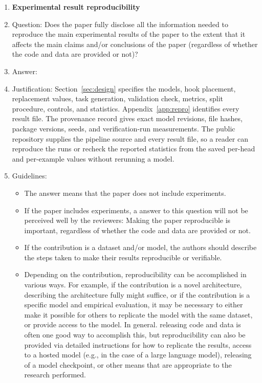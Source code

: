 \begin{enumerate}
    \item {\bf Experimental result reproducibility}
    \item[] Question: Does the paper fully disclose all the information needed to reproduce the main experimental results of the paper to the extent that it affects the main claims and/or conclusions of the paper (regardless of whether the code and data are provided or not)?
    \item[] Answer: \answerYes{}
    \item[] Justification: Section~\ref{sec:design} specifies the models, hook placement, replacement values, task generation, validation check, metrics, split procedure, controls, and statistics. Appendix~\ref{app:repro} identifies every result file. The provenance record gives exact model revisions, file hashes, package versions, seeds, and verification-run measurements. The public repository supplies the pipeline source and every result file, so a reader can reproduce the runs or recheck the reported statistics from the saved per-head and per-example values without rerunning a model.
    \item[] Guidelines:
    \begin{itemize}
        \item The answer \answerNA{} means that the paper does not include experiments.
        \item If the paper includes experiments, a \answerNo{} answer to this question will not be perceived well by the reviewers: Making the paper reproducible is important, regardless of whether the code and data are provided or not.
        \item If the contribution is a dataset and\slash or model, the authors should describe the steps taken to make their results reproducible or verifiable. 
        \item Depending on the contribution, reproducibility can be accomplished in various ways. For example, if the contribution is a novel architecture, describing the architecture fully might suffice, or if the contribution is a specific model and empirical evaluation, it may be necessary to either make it possible for others to replicate the model with the same dataset, or provide access to the model. In general. releasing code and data is often one good way to accomplish this, but reproducibility can also be provided via detailed instructions for how to replicate the results, access to a hosted model (e.g., in the case of a large language model), releasing of a model checkpoint, or other means that are appropriate to the research performed.

\end{itemize}
\end{enumerate}
